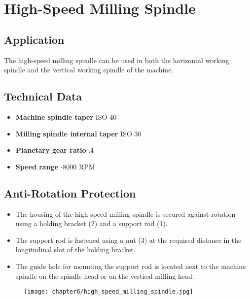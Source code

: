 
\section{High-Speed Milling Spindle}

\setcounter{section}{2}

\subsection*{Application}
The high-speed milling spindle can be used in both the horizontal working spindle and the vertical working spindle of the machine.

\subsection*{Technical Data}
\begin{itemize}
    \item \textbf{Machine spindle taper} \dotfill ISO 40
    \item \textbf{Milling spindle internal taper} \dotfill ISO 30
    \item \textbf{Planetary gear ratio} :4
    \item \textbf{Speed range} -8000 RPM\footnotemark[1]
\end{itemize}

\subsection*{Anti-Rotation Protection}
\begin{itemize}
    \item The housing of the high-speed milling spindle is secured against rotation using a holding bracket (2) and a support rod (1).
    \item The support rod is fastened using a nut (3) at the required distance in the longitudinal slot of the holding bracket.
    \item The guide hole for mounting the support rod is located next to the machine spindle on the spindle head or on the vertical milling head.
\end{itemize}

\begin{figure}[h]
    \centering
    \texttt{[image: chapter6/high\_speed\_milling\_spindle.jpg]}
\end{figure}

